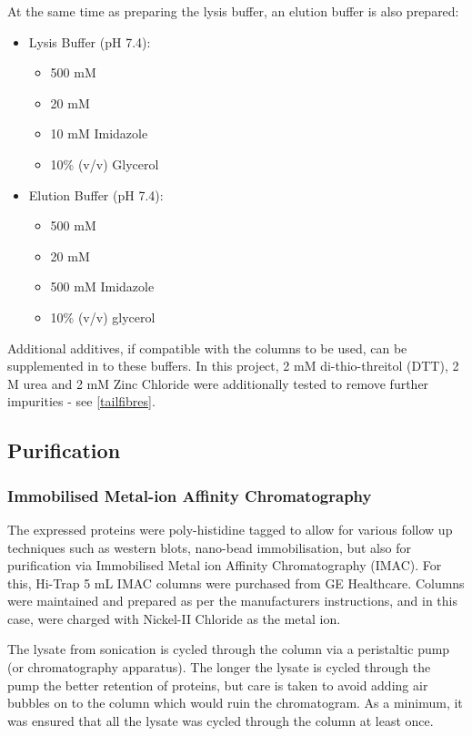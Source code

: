 At the same time as preparing the lysis buffer, an elution buffer is also prepared:


		\small
		\begin{itemize}
		\item Lysis Buffer (pH 7.4):
			\begin{itemize}
			\item 500 mM \NaCl{}
			\item 20 mM \NaPO{}
			\item 10 mM Imidazole
			\item 10\% (v/v) Glycerol
			\end{itemize}
		\item Elution Buffer (pH 7.4):
			\begin{itemize}
			\item 500 mM \NaCl{}
			\item 20 mM \NaPO{}
			\item 500 mM Imidazole
			\item 10\% (v/v) glycerol
			\end{itemize}
		\end{itemize}
		\normalsize
	
Additional additives, if compatible with the columns to be used, can be supplemented in to these buffers. In this project, 2 mM di-thio-threitol (DTT), 2 M urea and 2 mM Zinc Chloride were additionally tested to remove further impurities - see \vref{tailfibres}.

\subsection{Purification}
\subsubsection{Immobilised Metal-ion Affinity Chromatography}
The expressed proteins were poly-histidine tagged to allow for various follow up techniques such as western blots, nano-bead immobilisation, but also for purification via Immobilised Metal ion Affinity Chromatography (IMAC). For this, Hi-Trap 5 mL IMAC columns were purchased from GE Healthcare. Columns were maintained and prepared as per the manufacturers instructions, and in this case, were charged with Nickel-II Chloride as the metal ion.

The lysate from sonication is cycled through the column via a peristaltic pump (or chromatography apparatus). The longer the lysate is cycled through the pump the better retention of proteins, but care is taken to avoid adding air bubbles on to the column which would ruin the chromatogram. As a minimum, it was ensured that all the lysate was cycled through the column at least once.

